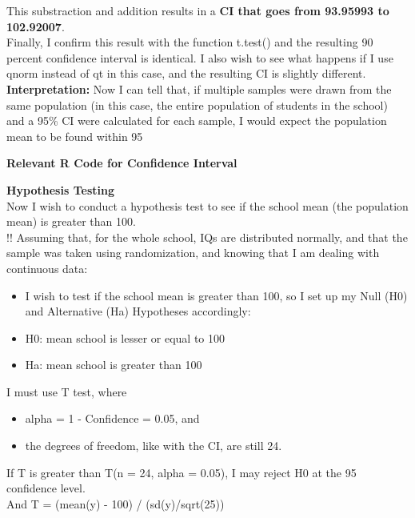 \documentclass[12pt,letterpaper]{article}
\begin{document}
\noindent This substraction and addition results in a  \textbf{CI that goes from 93.95993 to 102.92007}. \\

\noindent Finally, I confirm this result with the function t.test() and the resulting 90 percent confidence interval is identical. I also wish to see what happens if I use qnorm instead of qt in this case, and the resulting CI is slightly different. \\

\noindent \textbf{Interpretation:} Now I can tell that, if multiple samples were drawn from the same population (in this case, the entire population of students in the school) and a 95\% CI were calculated for each sample, I would expect the population mean to be found within 95%


\newpage

\noindent \textbf {Relevant R Code for Confidence Interval}



\newpage

\noindent \textbf {Hypothesis Testing} \\

\noindent Now I wish to conduct a hypothesis test to see if the school mean (the population mean) is greater than 100. \\

\noindent !! Assuming that, for the whole school, IQs are distributed normally, and that the sample was taken using randomization, and knowing that I am dealing with continuous data: 

\begin{itemize}
\item I wish to test if the school mean is greater than 100, so I set up my Null (H0) and Alternative (Ha) Hypotheses accordingly: 
\item H0:  mean school is lesser or equal to 100
\item Ha: mean school is greater than 100
\end{itemize}

I must use T test, where 
\begin{itemize}
\item alpha = 1 - Confidence = 0.05, and
\item the degrees of freedom, like with the CI, are still 24.
\end{itemize}

\noindent If T is greater than T(n = 24, alpha = 0.05), I may reject H0 at the 95 confidence level. \\
\noindent And T = (mean(y) - 100) / (sd(y)/sqrt(25))
\end{document}
